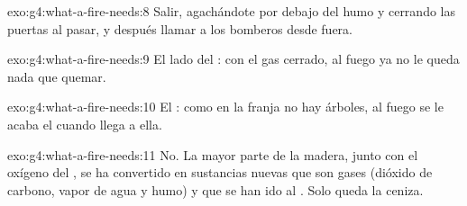 \begin{solution}{exo:g4:what-a-fire-needs:8}
Salir, agachándote por debajo del humo y cerrando las puertas al pasar,
y después llamar a los bomberos desde fuera.
\end{solution}

\begin{solution}{exo:g4:what-a-fire-needs:9}
El lado del : con el gas cerrado, al fuego ya no le queda
nada que quemar.
\end{solution}

\begin{solution}{exo:g4:what-a-fire-needs:10}
El : como en la franja no hay árboles, al fuego se le acaba
el  cuando llega a ella.
\end{solution}

\begin{solution}{exo:g4:what-a-fire-needs:11}
No. La mayor parte de la madera, junto con el oxígeno del , se ha
convertido en sustancias nuevas que son gases (dióxido de carbono,
vapor de agua y humo) y que se han ido al . Solo queda la ceniza.
\end{solution}
